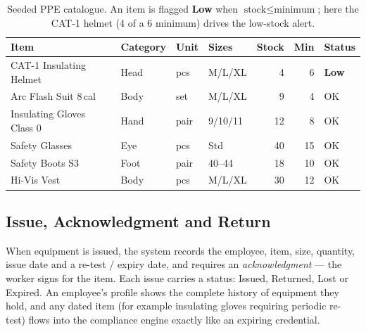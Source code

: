 \documentclass[11pt]{article}
\begin{document}
\begin{table}[H]
\centering\small
\begin{tabular}{@{}l l l l r r l@{}}
\toprule
\textbf{Item} & \textbf{Category} & \textbf{Unit} & \textbf{Sizes} & \textbf{Stock} & \textbf{Min} & \textbf{Status} \\
\midrule
CAT-1 Insulating Helmet    & Head & pcs  & M/L/XL   & 4  & 6  & \textbf{Low} \\
Arc Flash Suit 8\,cal      & Body & set  & M/L/XL   & 9  & 4  & OK \\
Insulating Gloves Class 0  & Hand & pair & 9/10/11  & 12 & 8  & OK \\
Safety Glasses             & Eye  & pcs  & Std      & 40 & 15 & OK \\
Safety Boots S3            & Foot & pair & 40--44   & 18 & 10 & OK \\
Hi-Vis Vest                & Body & pcs  & M/L/XL   & 30 & 12 & OK \\
\bottomrule
\end{tabular}
\caption{Seeded PPE catalogue. An item is flagged \textbf{Low} when $\text{stock} \leq \text{minimum}$;
here the CAT-1 helmet (4 of a 6 minimum) drives the low-stock alert.}
\end{table}

\subsection{Issue, Acknowledgment and Return}
When equipment is issued, the system records the employee, item, size, quantity, issue date and a
re-test / expiry date, and requires an \emph{acknowledgment} --- the worker signs for the item. Each
issue carries a status: \textsf{Issued}, \textsf{Returned}, \textsf{Lost} or \textsf{Expired}. An
employee's profile shows the complete history of equipment they hold, and any dated item (for example
insulating gloves requiring periodic re-test) flows into the compliance engine exactly like an
expiring credential.
\end{document}
